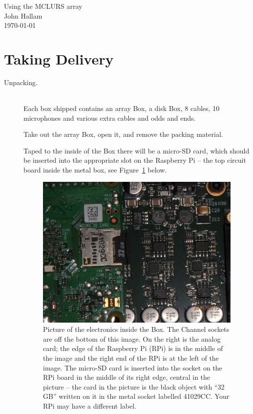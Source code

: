\documentclass[12pt]{article}
\begin{document}
\begin{center}
\large Using the MCLURS array  \\[5mm]

\footnotesize John Hallam \\[5mm] 
\today \\[5mm]
\end{center}

\section{Taking Delivery}

\begin{description}
\item[Unpacking.] ~\\

  Each box shipped contains an array Box, a disk Box, 8 cables, 10
  microphones and various extra cables and odds and ends.

  Take out the array Box, open it, and remove the packing material.

  Taped to the inside of the Box there will be a micro-SD card, which
  should be inserted into the appropriate slot on the Raspberry Pi --
  the top circuit board inside the metal box, see
  Figure~\ref{fig:sdcard} below.

\begin{figure}[bh]
  \begin{center}
    \includegraphics[width=0.9\linewidth]{P3150230}

    \caption{\label{fig:sdcard}
%
      Picture of the electronics inside the Box.  The Channel sockets
      are off the bottom of this image.  On the right is the analog
      card; the edge of the Raspberry Pi (RPi) is in the middle of the
      image and the right end of the RPi is at the left of the image.
      The micro-SD card is inserted into the socket on the RPi board
      in the middle of its right edge, central in the picture -- the
      card in the picture is the black object with ``32 GB'' written
      on it in the metal socket labelled 41029CC.  Your RPi may have a
      different label.}
  \end{center}
\end{figure}


\end{description}
\end{document}
